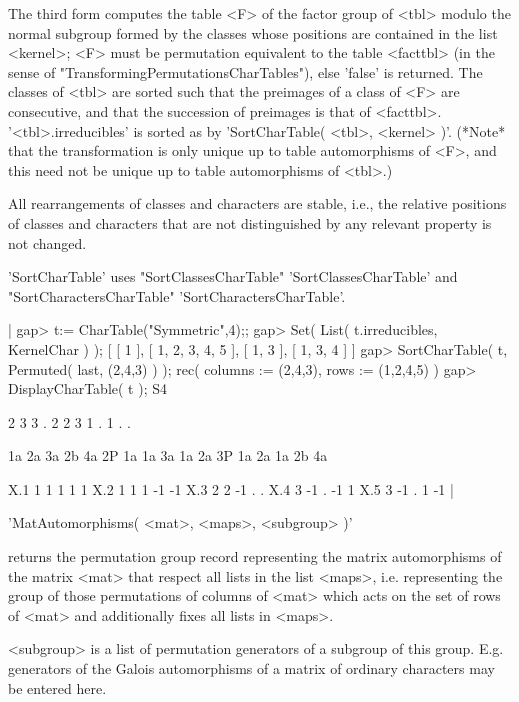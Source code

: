 The third form computes the table <F> of the factor group of <tbl>
modulo the normal subgroup formed by the classes whose positions are
contained in the list <kernel>;
<F> must be permutation equivalent to the table <facttbl> (in the
sense of "TransformingPermutationsCharTables"), else 'false' is
returned.  The classes of <tbl> are sorted such that the preimages
of a class of <F> are consecutive, and that the succession of
preimages is that of <facttbl>.  '<tbl>.irreducibles' is sorted as
by 'SortCharTable( <tbl>, <kernel> )'.
(*Note* that the transformation is only unique up to table automorphisms
of <F>, and this need not be unique up to table automorphisms of <tbl>.)

All rearrangements of classes and characters are stable, i.e., the
relative positions of classes and characters that are not distinguished
by any relevant property is not changed.

'SortCharTable' uses "SortClassesCharTable" 'SortClassesCharTable' and
"SortCharactersCharTable" 'SortCharactersCharTable'.

|    gap> t:= CharTable("Symmetric",4);;
    gap> Set( List( t.irreducibles, KernelChar ) );
    [ [ 1 ], [ 1, 2, 3, 4, 5 ], [ 1, 3 ], [ 1, 3, 4 ] ]
    gap> SortCharTable( t, Permuted( last, (2,4,3) ) );
    rec(
      columns := (2,4,3),
      rows := (1,2,4,5) )
    gap> DisplayCharTable( t );
    S4

         2  3  3  .  2  2
         3  1  .  1  .  .

           1a 2a 3a 2b 4a
        2P 1a 1a 3a 1a 2a
        3P 1a 2a 1a 2b 4a

    X.1     1  1  1  1  1
    X.2     1  1  1 -1 -1
    X.3     2  2 -1  .  .
    X.4     3 -1  . -1  1
    X.5     3 -1  .  1 -1
    |

%

'MatAutomorphisms( <mat>, <maps>, <subgroup> )'

returns the permutation group record representing the matrix
automorphisms of the matrix <mat> that respect all lists in the list
<maps>, i.e. representing the group of those permutations of columns of
<mat> which acts on the set of rows of <mat> and additionally fixes all
lists in <maps>.

<subgroup> is a list of permutation generators of a subgroup of this
group. E.g. generators of the Galois automorphisms of a matrix of
ordinary characters may be entered here.

